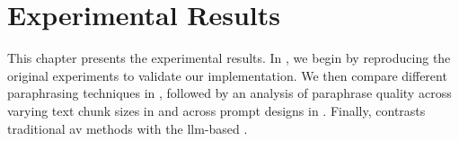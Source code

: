 \chapter{Experimental Results}
\label{chap:experimental_results}

This chapter presents the experimental results. 
In , we begin by reproducing the original experiments to validate our implementation. 
We then compare different paraphrasing techniques in , followed by an analysis of paraphrase quality across varying text chunk sizes in  and across prompt designs in . 
Finally,  contrasts traditional \ac{av} methods with the \ac{llm}-based \impAppr{}.









